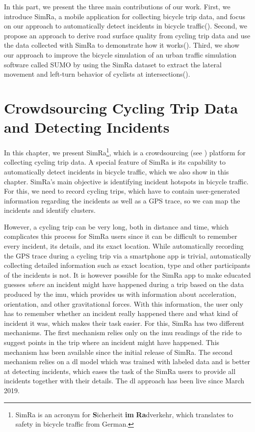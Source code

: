 \vspace*{\fill}
In this part, we present the three main contributions of our work.
First, we introduce SimRa, a mobile application for collecting bicycle trip data, and focus on our approach to automatically detect incidents in bicycle traffic().
Second, we propose an approach to derive road surface quality from cycling trip data and use the data collected with SimRa to demonstrate how it works().
Third, we show our approach to improve the bicycle simulation of an urban traffic simulation software called SUMO by using the SimRa dataset to extract the lateral movement and left-turn behavior of cyclists at intersections().
\vspace*{\fill}
\cleardoublepage
\newpage
\chapter{Crowdsourcing Cycling Trip Data and Detecting Incidents}
\label{cha:cyclesense}
In this chapter, we present SimRa\footnote{SimRa is an acronym for \textbf{S}icherheit \textbf{im} \textbf{Ra}dverkehr, which translates to safety in bicycle traffic from German.}, which is a crowdsourcing (see ) platform for collecting cycling trip data.
A special feature of SimRa is its capability to automatically detect incidents in bicycle traffic, which we also show in this chapter.
SimRa's main objective is identifying incident hotspots in bicycle traffic.
For this, we need to record cycling trips, which have to contain user-generated information regarding the incidents as well as a GPS trace, so we can map the incidents and identify clusters.

However, a cycling trip can be very long, both in distance and time, which complicates this process for SimRa users since it can be difficult to remember every incident, its details, and its exact location.
While automatically recording the GPS trace during a cycling trip via a smartphone app is trivial, automatically collecting detailed information such as exact location, type and other participants of the incidents is not.
It is however possible for the SimRa app to make educated guesses \textit{where} an incident might have happened during a trip based on the data produced by the \ac{imu}, which provides us with information about acceleration, orientation, and other gravitational forces.
With this information, the user only has to remember whether an incident really happened there and what kind of incident it was, which makes their task easier.
For this, SimRa has two different mechanisms.
The first mechanism relies only on the \ac{imu} readings of the ride to suggest points in the trip where an incident might have happened.
This mechanism has been available since the initial release of SimRa.
The second mechanism relies on a \ac{dl} model which was trained with labeled data and is better at detecting incidents, which eases the task of the SimRa users to provide all incidents together with their details.
The \ac{dl} approach has been live since March 2019.

